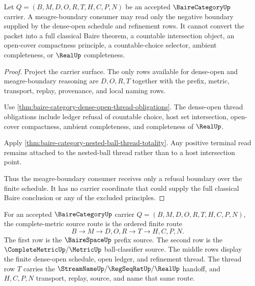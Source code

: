 \begin{theorem}
\label{thm:baire-category-meagre-boundary-refusal}
Let $Q=(B,M,D,O,R,T,H,C,P,N)$ be an accepted $\BaireCategoryUp$ carrier. A meagre-boundary consumer may read only the negative boundary supplied by the dense-open schedule and refinement rows. It cannot convert the packet into a full classical Baire theorem, a countable intersection object, an open-cover compactness principle, a countable-choice selector, ambient completeness, or $\RealUp$ completeness.
\end{theorem}
\begin{proof}
Project the carrier surface. The only rows available for dense-open and meagre-boundary reasoning are $D,O,R,T$ together with the prefix, metric, transport, replay, provenance, and local naming rows.

Use \autoref{thm:baire-category-dense-open-thread-obligations}. The dense-open thread obligations include ledger refusal of countable choice, host set intersection, open-cover compactness, ambient completeness, and completeness of $\RealUp$.

Apply \autoref{thm:baire-category-nested-ball-thread-totality}. Any positive terminal read remains attached to the nested-ball thread rather than to a host intersection point.

Thus the meagre-boundary consumer receives only a refusal boundary over the finite schedule. It has no carrier coordinate that could supply the full classical Baire conclusion or any of the excluded principles.
\end{proof}

\begin{definition}
\label{def:bairecategory-complete-metric-source-route}
For an accepted $\BaireCategoryUp$ carrier $Q=(B,M,D,O,R,T,H,C,P,N)$, the complete-metric source route is the ordered finite route
$$
B \longrightarrow M \longrightarrow D,O,R \longrightarrow T \longrightarrow H,C,P,N .
$$
The first row is the $\BaireSpaceUp$ prefix source. The second row is the $\CompleteMetricUp/\MetricUp$ ball-classifier source. The middle rows display the finite dense-open schedule, open ledger, and refinement thread. The thread row $T$ carries the $\StreamNameUp/\RegSeqRatUp/\RealUp$ handoff, and $H,C,P,N$ transport, replay, source, and name that same route.
\end{definition}

